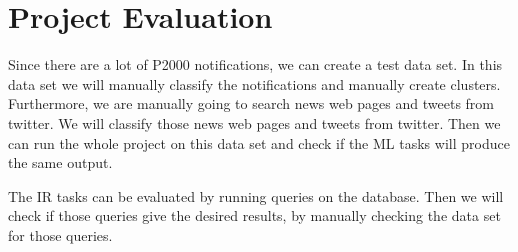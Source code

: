 \section{Project Evaluation}
Since there are a lot of P2000 notifications, we can create a test data set. 
In this data set we will manually classify the notifications and manually create clusters. 
Furthermore, we are manually going to search news web pages and tweets from twitter.
We will classify those news web pages and tweets from twitter. 
Then we can run the whole project on this data set  and check if the ML tasks will produce the same output.

The IR tasks can be evaluated by running queries on the database. 
Then we will check if those queries give the desired results, by manually checking the data set for those queries.